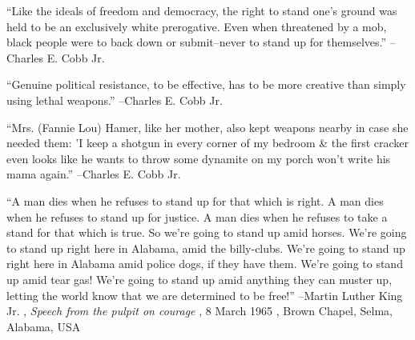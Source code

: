 \documentclass{article}%
\begin{document}
\linebreak%
\vspace{1mm}%
\begin{minipage}{\textwidth}%
\flushleft%
“Like the ideals of freedom and democracy, the right to stand one's ground was held to be an exclusively white prerogative. Even when threatened by a mob, black people were to back down or submit–never to stand up for themselves.”%
\linebreak%
\vspace{1mm}%
–Charles E. Cobb Jr.%
\linebreak%
\vspace{1mm}%
\end{minipage}%
\linebreak%
\vspace{1mm}%
\begin{minipage}{\textwidth}%
\flushleft%
“Genuine political resistance, to be effective, has to be more creative than simply using lethal weapons.”%
\linebreak%
\vspace{1mm}%
–Charles E. Cobb Jr.%
\linebreak%
\vspace{1mm}%
\end{minipage}%
\linebreak%
\vspace{1mm}%
\begin{minipage}{\textwidth}%
\flushleft%
“Mrs. (Fannie Lou) Hamer, like her mother, also kept weapons nearby in case she needed them: 'I keep a shotgun in every corner of my bedroom \& the first cracker even looks like he wants to throw some dynamite on my porch won't write his mama again.”%
\linebreak%
\vspace{1mm}%
–Charles E. Cobb Jr.%
\linebreak%
\vspace{1mm}%
\end{minipage}%
\linebreak%
\vspace{1mm}%
\begin{minipage}{\textwidth}%
\flushleft%
“A man dies when he refuses to stand up for that which is right. A man dies when he refuses to stand up for justice. A man dies when he refuses to take a stand for that which is true. So we're going to stand up amid horses. We're going to stand up right here in Alabama, amid the billy{-}clubs. We're going to stand up right here in Alabama amid police dogs, if they have them. We're going to stand up amid tear gas! We're going to stand up amid anything they can muster up, letting the world know that we are determined to be free!”%
\linebreak%
\vspace{1mm}%
–Martin Luther King Jr.%
, \textit{Speech from the pulpit on courage}%
, 8 March 1965%
, Brown Chapel, Selma, Alabama, USA%
\linebreak%
\vspace{1mm}%
\end{minipage}%
\end{document}
